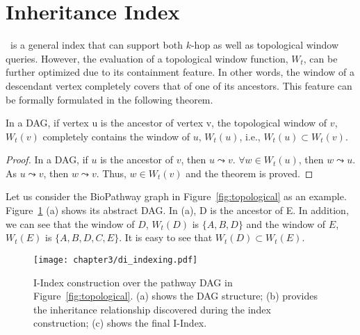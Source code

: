 \section{Inheritance Index}
\DBIndex\ is a general index that can support both $k$-hop as well as
topological window queries. 
However, the evaluation of a topological window function, $W_t$, 
can be further optimized due to its containment feature. 
In other words, the window of a descendant vertex 
completely covers that of one of its ancestors. 
This feature can be formally formulated in the following theorem. 

\begin{theorem}
\label{thm:containment}
In a DAG, if vertex u is the ancestor of vertex v, the topological window of $v$, $W_t(v)$ completely contains the window of $u$, $W_t(u)$, i.e., $W_t(u) \subset W_t(v)$.   
\end{theorem}

\begin{proof}
In a DAG, if $u$ is the ancestor of $v$, then $u \leadsto v$. $\forall w \in W_t(u)$, then $w \leadsto u$. As $u \leadsto v$, then $w \leadsto v$. Thus, $w \in W_t(v)$ and the theorem is proved.   
\end{proof}

Let us consider the BioPathway graph in Figure~\ref{fig:topological} as
an example.
Figure~\ref{fig:diff-index} (a) shows its abstract DAG. In (a), 
D is the ancestor of E. In addition, we can see that the window of $D$, 
$W_t(D)$ is $\{A, B, D\}$ and the window of $E$, $W_t(E)$ is $\{A, B, D, C, E\}$. It is easy to see that $W_t(D) \subset W_t(E)$. 

\begin{figure}[t]
\centering
\texttt{[image: chapter3/di\_indexing.pdf]}
	\caption{I-Index construction over the pathway DAG in Figure~\ref{fig:topological}. (a) shows the DAG structure; (b) provides the inheritance relationship discovered during the index construction; (c) shows the final I-Index.}
	\label{fig:diff-index}
\end{figure}

